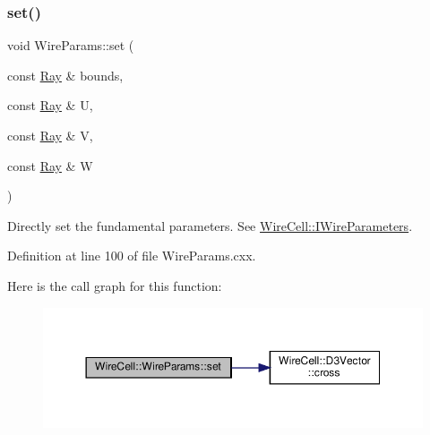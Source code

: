\subsubsection{\texorpdfstring{set()}{set()}\hspace{0.1cm}{\footnotesize\ttfamily [1/2]}}
{\footnotesize\ttfamily void Wire\+Params\+::set (\begin{DoxyParamCaption}\item[{const \hyperlink{namespace_wire_cell_a3ab20d9b438feb7eb1ffaab9ba98af0c}{Ray} \&}]{bounds,  }\item[{const \hyperlink{namespace_wire_cell_a3ab20d9b438feb7eb1ffaab9ba98af0c}{Ray} \&}]{U,  }\item[{const \hyperlink{namespace_wire_cell_a3ab20d9b438feb7eb1ffaab9ba98af0c}{Ray} \&}]{V,  }\item[{const \hyperlink{namespace_wire_cell_a3ab20d9b438feb7eb1ffaab9ba98af0c}{Ray} \&}]{W }\end{DoxyParamCaption})}

Directly set the fundamental parameters. See \hyperlink{class_wire_cell_1_1_i_wire_parameters}{Wire\+Cell\+::\+I\+Wire\+Parameters}. 

Definition at line 100 of file Wire\+Params.\+cxx.

Here is the call graph for this function\+:
\nopagebreak
\begin{figure}[H]
\begin{center}
\leavevmode
\includegraphics[width=350pt]{class_wire_cell_1_1_wire_params_a7ad51fcb64c9edae1695873f1bec86dc_cgraph}
\end{center}
\end{figure}
\mbox{\label{class_wire_cell_1_1_wire_params_ac1e2cdbafe981979f06d802675f1e8ff}} 
